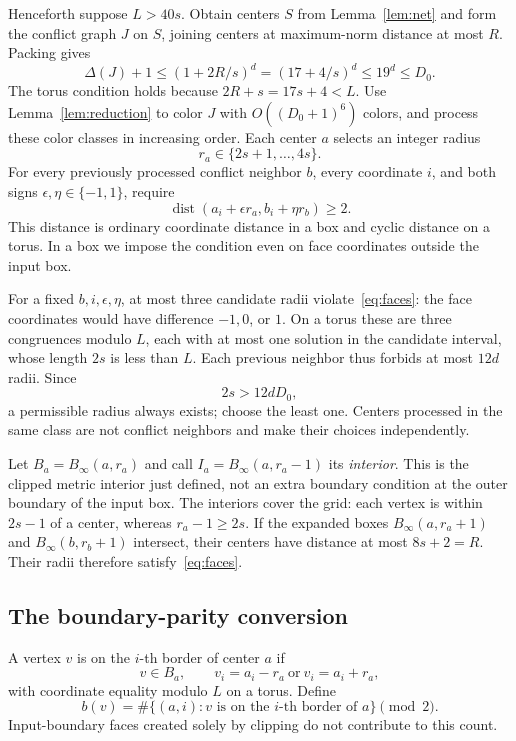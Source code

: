 \documentclass[11pt]{article}
\theoremstyle{definition}\newtheorem{definition}[theorem]{Definition}
\theoremstyle{remark}\newtheorem{remark}[theorem]{Remark}
\newcommand{\dist}{\operatorname{dist}}
\begin{document}
Henceforth suppose $L>40s$. Obtain centers $S$ from
Lemma~\ref{lem:net} and form the conflict graph $J$ on $S$, joining
centers at maximum-norm distance at most $R$. Packing gives
\[
 \Delta(J)+1\le(1+2R/s)^d=(17+4/s)^d\le19^d\le D_0.
\]
The torus condition holds because $2R+s=17s+4<L$.
Use Lemma~\ref{lem:reduction} to color $J$ with
$O((D_0+1)^6)$ colors, and process these color classes in increasing
order. Each center $a$ selects an integer radius
\begin{equation}\label{eq:radiusrange}
                         r_a\in\{2s+1,\ldots,4s\}.
\end{equation}
For every previously processed conflict neighbor $b$, every coordinate
$i$, and both signs $\epsilon,\eta\in\{-1,1\}$, require
\begin{equation}\label{eq:faces}
           \dist(a_i+\epsilon r_a,b_i+\eta r_b)\ge2.
\end{equation}
This distance is ordinary coordinate distance in a box and cyclic
distance on a torus. In a box we impose the condition even on face
coordinates outside the input box.

For a fixed $b,i,\epsilon,\eta$, at most three candidate radii
violate~\eqref{eq:faces}: the face coordinates would have difference
$-1,0$, or $1$. On a torus these are three congruences modulo $L$,
each with at most one solution in the candidate interval, whose
length $2s$ is less than $L$. Each previous neighbor thus forbids
at most $12d$ radii. Since
\[
                          2s>12dD_0,
\]
a permissible radius always exists; choose the least one. Centers
processed in the same class are not conflict neighbors and make
their choices independently.

Let $B_a=B_\infty(a,r_a)$ and call
$I_a=B_\infty(a,r_a-1)$ its \emph{interior}. This is the clipped
metric interior just defined, not an extra boundary condition at
the outer boundary of the input box. The interiors cover the grid:
each vertex is within $2s-1$ of a center, whereas $r_a-1\ge2s$.
If the expanded boxes $B_\infty(a,r_a+1)$ and
$B_\infty(b,r_b+1)$ intersect, their centers have distance at most
$8s+2=R$. Their radii therefore satisfy~\eqref{eq:faces}.

\subsection{The boundary-parity conversion}

A vertex $v$ is on the $i$-th border of center $a$ if
\[
        v\in B_a,\qquad v_i=a_i-r_a\ \text{or}\ v_i=a_i+r_a,
\]
with coordinate equality modulo $L$ on a torus. Define
\begin{equation}\label{eq:borderbit}
 b(v)=\#\{(a,i):v\text{ is on the }i\text{-th border of }a\}
                  \pmod2.
\end{equation}
Input-boundary faces created solely by clipping do not contribute
to this count.
\end{document}
